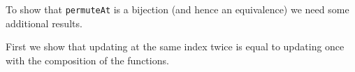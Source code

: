 To show that \texttt{permuteAt} is a bijection (and hence an equivalence) we need
some additional results.

First we show that updating at the same index twice is equal to updating once with the
composition of the functions.

\begin{code}%
\>[0]\AgdaSpace{}%
\AgdaSymbol{:}%
\>[276I]\AgdaSpace{}%
\AgdaSymbol{\{}\AgdaSymbol{\}}\AgdaSpace{}%
\AgdaSymbol{\{}\AgdaSpace{}%
\AgdaSymbol{:}\AgdaSpace{}%
\AgdaSymbol{\}}\AgdaSpace{}%
\AgdaSymbol{(}\AgdaSpace{}%
\AgdaSymbol{:}\AgdaSpace{}%
\AgdaSpace{}%
\AgdaSpace{}%
\AgdaSymbol{)}\AgdaSpace{}%
\AgdaSymbol{(}\AgdaSpace{}%
\AgdaSymbol{:}\AgdaSpace{}%
\AgdaSpace{}%
\AgdaSpace{}%
\AgdaSymbol{)}\AgdaSpace{}%
\AgdaSymbol{(}\AgdaSpace{}%
\AgdaSymbol{:}\AgdaSpace{}%
\AgdaSpace{}%
\AgdaSymbol{)}\<%
\\
\>[.][@{}l@{}]\<[276I]%
\>[12]\AgdaSpace{}%
\AgdaSymbol{(}\AgdaSpace{}%
\AgdaOperator{\AgdaFunction{[}}\AgdaSpace{}%
\AgdaSpace{}%
\AgdaOperator{\AgdaFunction{]\%=}}\AgdaSpace{}%
\AgdaSpace{}%
\AgdaOperator{\AgdaFunction{[}}\AgdaSpace{}%
\AgdaSpace{}%
\AgdaOperator{\AgdaFunction{]\%=}}\AgdaSpace{}%
\AgdaSymbol{)}\AgdaSpace{}%
\AgdaSpace{}%
\AgdaSymbol{(}\AgdaSpace{}%
\AgdaOperator{\AgdaFunction{[}}\AgdaSpace{}%
\AgdaSpace{}%
\AgdaOperator{\AgdaFunction{]\%=}}\AgdaSpace{}%
\AgdaSpace{}%
\AgdaSpace{}%
\AgdaSymbol{)}\<%
\end{code}
\begin{code}[hide]%
\>[0]\AgdaSpace{}%
\AgdaSpace{}%
\AgdaSymbol{(}\AgdaSpace{}%
\AgdaSpace{}%
\AgdaSymbol{)}\AgdaSpace{}%
\AgdaSpace{}%
\AgdaSymbol{=}\AgdaSpace{}%
\<%
\\
\>[0]\AgdaSpace{}%
\AgdaSpace{}%
\AgdaSymbol{(}\AgdaSpace{}%
\AgdaSpace{}%
\AgdaSymbol{)}\AgdaSpace{}%
\AgdaSymbol{(}\AgdaSpace{}%
\AgdaSymbol{)}\AgdaSpace{}%
\AgdaSymbol{=}\AgdaSpace{}%
\AgdaSpace{}%
\AgdaSymbol{(}\AgdaSpace{}%
\AgdaSymbol{)}\AgdaSpace{}%
\AgdaSymbol{(}\AgdaSpace{}%
\AgdaSpace{}%
\AgdaSpace{}%
\AgdaSymbol{)}\<%
\end{code}
